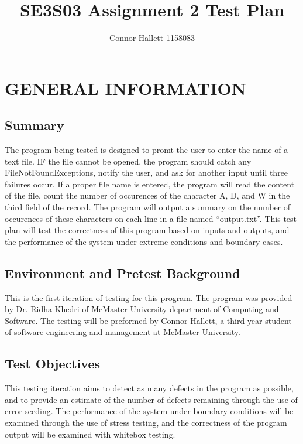 \documentclass[]{article}
\title{SE3S03 Assignment 2 Test Plan}
\author{Connor Hallett 1158083}
\date{}
\begin{document}
\maketitle	

\section{GENERAL INFORMATION}
\label{sec:introduction}

\subsection{Summary}
\label{sub:purpose}
The program being tested is designed to promt the user to enter the name of a
text file.  IF the file cannot be opened, the program should catch any
FileNotFoundExceptions, notify the user, and ask for another input until three
failures occur.  If a proper file name is entered, the program will read the
content of the file, count the number of occurences of the character A, D, and W
in the third field of the record.  The program will output a summary on the
number of occurences of these characters on each line in a file named
``output.txt''.  This test plan will test the correctness of this program based
on inputs and outputs, and the performance of the system under extreme
conditions and boundary cases.

\subsection{Environment and Pretest Background}
\label{sub:scope}
This is the first iteration of testing for this program.  The program was
provided by Dr. Ridha Khedri of McMaster University department of Computing and
Software.  The testing will be preformed by Connor Hallett, a third year student
of software engineering and management at McMaster University.

\subsection{Test Objectives}
\label{sub:definitions_acronyms_and_abbreviations}
This testing iteration aims to detect as many defects in the program as
possible, and to provide an estimate of the number of defects remaining through
the use of error seeding. The performance of the system under boundary
conditions will be examined through the use of stress testing, and the
correctness of the program output will be examined with whitebox testing.
\end{document}
